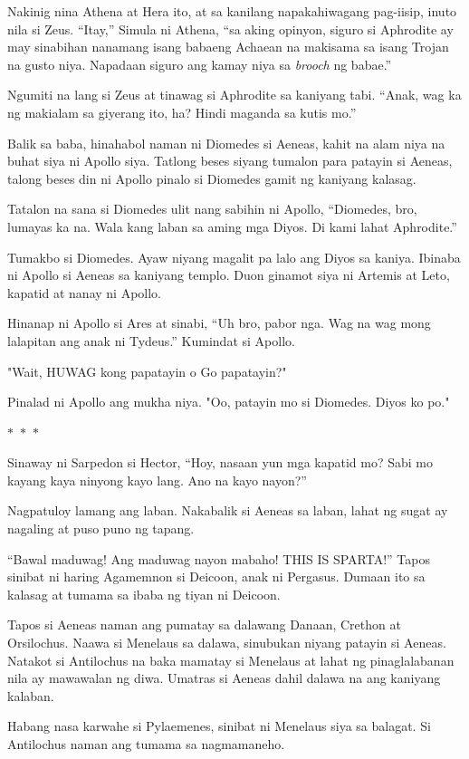 \documentclass[12pt,letterpaper]{report}
\newcommand{\seperate}{\begin{center}$\ast$~$\ast$~$\ast$\end{center}}
\begin{document}
Nakinig nina Athena at Hera ito, at sa kanilang napakahiwagang pag-iisip, inuto nila si Zeus. ``Itay,'' Simula ni Athena, ``sa aking opinyon, siguro si Aphrodite ay may sinabihan nanamang isang babaeng Achaean na makisama sa isang Trojan na gusto niya. Napadaan siguro ang kamay niya sa \textit{brooch} ng babae.''

Ngumiti na lang si Zeus at tinawag si Aphrodite sa kaniyang tabi. ``Anak, wag ka ng makialam sa giyerang ito, ha? Hindi maganda sa kutis mo.''

Balik sa baba, hinahabol naman ni Diomedes si Aeneas, kahit na alam niya na buhat siya ni Apollo siya. Tatlong beses siyang tumalon para patayin si Aeneas, talong beses din ni Apollo pinalo si Diomedes gamit ng kaniyang kalasag.

Tatalon na sana si Diomedes ulit nang sabihin ni Apollo, ``Diomedes, bro, lumayas ka na. Wala kang laban sa aming mga Diyos. Di kami lahat Aphrodite.''

Tumakbo si Diomedes. Ayaw niyang magalit pa lalo ang Diyos sa kaniya. Ibinaba ni Apollo si Aeneas sa kaniyang templo. Duon ginamot siya ni Artemis at Leto, kapatid at nanay ni Apollo.

Hinanap ni Apollo si Ares at sinabi, ``Uh bro, pabor nga. Wag na wag mong lalapitan ang anak ni Tydeus.'' Kumindat si Apollo.

"Wait, HUWAG kong papatayin o Go papatayin?"

Pinalad ni Apollo ang mukha niya. "Oo, patayin mo si Diomedes. Diyos ko po."

\seperate

Sinaway ni Sarpedon si Hector, ``Hoy, nasaan yun mga kapatid mo? Sabi mo kayang kaya ninyong kayo lang. Ano na kayo nayon?''

Nagpatuloy lamang ang laban. Nakabalik si Aeneas sa laban, lahat ng sugat ay nagaling at puso puno ng tapang.

``Bawal maduwag! Ang maduwag nayon mabaho! THIS IS SPARTA!'' Tapos sinibat ni haring Agamemnon si Deicoon, anak ni Pergasus. Dumaan ito sa kalasag at tumama sa ibaba ng tiyan ni Deicoon.

Tapos si Aeneas naman ang pumatay sa dalawang Danaan, Crethon at Orsilochus. Naawa si Menelaus sa dalawa, sinubukan niyang patayin si Aeneas. Natakot si Antilochus na baka mamatay si Menelaus at lahat ng pinaglalabanan nila ay mawawalan ng diwa. Umatras si Aeneas dahil dalawa na ang kaniyang kalaban.

Habang nasa karwahe si Pylaemenes, sinibat ni Menelaus siya sa balagat. Si Antilochus naman ang tumama sa nagmamaneho.
\end{document}
